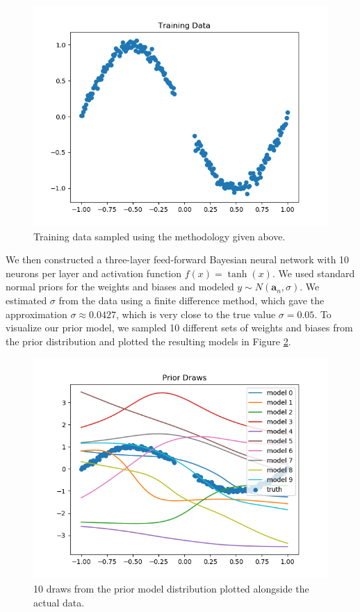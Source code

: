 \documentclass[
    preprint,
    12pt,
    letterpaper,
    longbibliography,
    nofootinbib,
    amsmath,
    amssymb,
    amsfonts,
]{revtex4-1}
\begin{document}
\begin{figure}
\includegraphics{Figure_1.png}
\caption{Training data sampled using the methodology given above.}
\label{fig:1}
\end{figure}

We then constructed a three-layer feed-forward Bayesian neural network with 10 neurons per layer and activation function $f(x) = \tanh(x)$. We used standard normal priors for the weights and biases and modeled $y \sim N(\bm a_n, \sigma)$. We estimated $\sigma$ from the data using a finite difference method, which gave the approximation $\sigma \approx 0.0427$, which is very close to the true value $\sigma = 0.05$. To visualize our prior model, we sampled 10 different sets of weights and biases from the prior distribution and plotted the resulting models in Figure \ref{fig:2}.

\begin{figure}
\includegraphics{Figure_2.png}
\caption{10 draws from the prior model distribution plotted alongside the actual data.}
\label{fig:2}
\end{figure}
\end{document}
